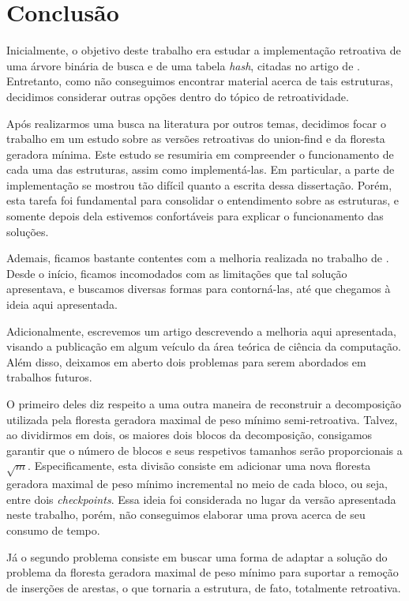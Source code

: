 
\chapter{Conclusão}
\label{cap:conclusao}

Inicialmente, o objetivo deste trabalho era estudar a implementação retroativa de uma árvore binária de busca e de uma tabela \emph{hash}, citadas no artigo de \citet{agarwalimplementation}. Entretanto, como não conseguimos encontrar material acerca de tais estruturas, decidimos considerar outras opções dentro do tópico de retroatividade.

Após realizarmos uma busca na literatura por outros temas, decidimos focar o trabalho em um estudo sobre as versões retroativas do union-find e da floresta geradora mínima. Este estudo se resumiria em compreender o funcionamento de cada uma das estruturas, assim como implementá-las. Em particular, a parte de implementação se mostrou tão difícil quanto a escrita dessa dissertação. Porém, esta tarefa foi fundamental para consolidar o entendimento sobre as estruturas, e somente depois dela estivemos confortáveis para explicar o funcionamento das soluções.

Ademais, ficamos bastante contentes com a melhoria realizada no trabalho de \citet{10.1093/comjnl/bxaa135}. Desde o início, ficamos incomodados com as limitações que tal solução apresentava, e buscamos diversas formas para contorná-las, até que chegamos à ideia aqui apresentada.

Adicionalmente, escrevemos um artigo descrevendo a melhoria aqui apresentada, visando a publicação em algum veículo da área teórica de ciência da computação. Além disso, deixamos em aberto dois problemas para serem abordados em trabalhos futuros.

O primeiro deles diz respeito a uma outra maneira de reconstruir a decomposição utilizada pela floresta geradora maximal de peso mínimo semi-retroativa. Talvez, ao dividirmos em dois, os maiores dois blocos da decomposição, consigamos garantir que o número de blocos e seus respetivos tamanhos serão proporcionais a $\sqrt{m}$. Especificamente, esta divisão consiste em adicionar uma nova floresta geradora maximal de peso mínimo incremental no meio de cada bloco, ou seja, entre dois \emph{checkpoints}. Essa ideia foi considerada no lugar da versão apresentada neste trabalho, porém, não conseguimos elaborar uma prova acerca de seu consumo de tempo.

Já o segundo problema consiste em buscar uma forma de adaptar a solução do problema da floresta geradora maximal de peso mínimo para suportar a remoção de inserções de arestas, o que tornaria a estrutura, de fato, totalmente retroativa.